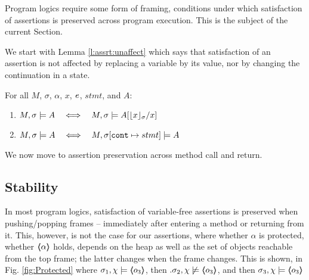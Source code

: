 Program logics require some form of framing, \ie conditions under which  satisfaction of  assertions is preserved across program execution. 
This is the subject of the current Section.

We start with  Lemma \ref{l:assrt:unaffect}  which says that satisfaction of an assertion is not affected by replacing a variable by its value, nor by changing the continuation in a state.


\begin{lemma}
\label{lemma:addr:expr}
\label{l:assrt:unaffect}
For all $M$, $\sigma$, $\alpha$, $x$, $\mathit{e}$, $stmt$, and $A$:

\begin{enumerate}
\item
\label{one:ad:exp}
\label{l:assrt:unaffect:one}
$\satisfiesA{M}{\sigma}{A}   \ \ \ \Longleftrightarrow\ \ \ \satisfiesA{M}{\sigma}{A[{\interpret \sigma x}/x]}   $ 
\item
$ \satisfiesA{M}{\sigma}{A}   \ \ \ \Longleftrightarrow\ \ \ \satisfiesA{M}{\sigma[\prg{cont}\mapsto stmt]}{A}$ 
\end{enumerate}

\end{lemma}

 \noindent
We now move to assertion preservation across method call and return. %

\subsection{Stability} %
\label{s:preserve:call:ret}
In most program logics, satisfaction of  variable-free assertions  is preserved when pushing/popping frames
-- \ie immediately after entering a method or  returning from it.
This, however, is not   the case for our assertions, where whether $\alpha$ is protected, \ie whether   $\langle\!\!\langle \alpha \rangle\!\!\rangle$ holds, depends on the heap as well as the set of objects reachable from the top frame;
the latter  changes when the frame changes.
This is shown, \eg in  Fig. \ref{fig:Protected} where 
$\sigma_1,\chi \models \langle\!\!\langle o_3 \rangle\!\!\rangle$, then $.\sigma_2,\chi \not\models \langle\!\!\langle o_3 \rangle\!\!\rangle$, and then $\sigma_3,\chi  \models \langle\!\!\langle o_3 \rangle\!\!\rangle$

